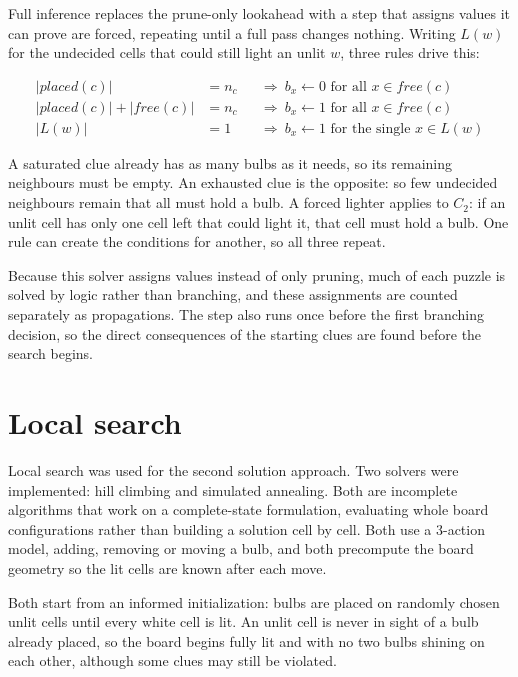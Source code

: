 \documentclass[12pt]{report}
\begin{document}
  Full inference replaces the prune-only lookahead with a step that assigns values it can
  prove are forced, repeating until a full pass changes nothing. Writing $L(w)$ for the
  undecided cells that could still light an unlit $w$, three rules drive this:

  \begin{align}
    |\mathit{placed}(c)| &= n_c
      && \Longrightarrow\ b_x \leftarrow 0 \text{ for all } x \in \mathit{free}(c)
      \tag{saturated clue} \\[2pt]
    |\mathit{placed}(c)| + |\mathit{free}(c)| &= n_c
      && \Longrightarrow\ b_x \leftarrow 1 \text{ for all } x \in \mathit{free}(c)
      \tag{exhausted clue} \\[2pt]
    |L(w)| &= 1
      && \Longrightarrow\ b_x \leftarrow 1 \text{ for the single } x \in L(w)
      \tag{forced lighter}
  \end{align}

  A saturated clue already has as many bulbs as it needs, so its remaining neighbours must
  be empty. An exhausted clue is the opposite: so few undecided neighbours remain that all
  must hold a bulb. A forced lighter applies to $C_2$: if an unlit cell has only one cell
  left that could light it, that cell must hold a bulb. One rule can create the conditions
  for another, so all three repeat.

  Because this solver assigns values instead of only pruning, much of each puzzle is solved
  by logic rather than branching, and these assignments are counted separately as
  propagations. The step also runs once before the first branching decision, so the direct
  consequences of the starting clues are found before the search begins.


\newpage
\section{Local search}

Local search was used for the second solution approach. Two solvers were implemented: hill climbing and simulated annealing. Both are incomplete algorithms that work on a complete-state formulation, evaluating whole board configurations rather than building a solution cell by cell. Both use a 3-action model, adding, removing or moving a bulb, and both precompute the board geometry so the lit cells are known after each move.

Both start from an informed initialization: bulbs are placed on randomly chosen unlit cells until every white cell is lit. An unlit cell is never in sight of a bulb already placed, so the board begins fully lit and with no two bulbs shining on each other, although some clues may still be violated.
\end{document}
